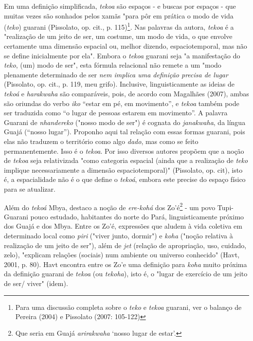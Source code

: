Em uma definição simplificada, \emph{tekoa} são espaços - e buscas por
espaços - que muitas vezes são sonhados pelos xamãs "para pôr em prática
o modo de vida (\emph{teko}) guarani (Pissolato, op. cit., p.
115)\footnote{Para uma discussão completa sobre o \emph{teko} e
  \emph{tekoa} guarani, ver o balanço de Pereira (2004) e Pissolato
  (2007: 105-122)}. Nas palavras da autora, \emph{tekoa} é a "realização
de um jeito de ser, um costume, um modo de vida, o que envolve
certamente uma dimensão espacial ou, melhor dizendo, espaciotemporal,
mas não se define inicialmente por ela". Embora o \emph{tekoa} guarani
seja "a manifestação do \emph{teko}, (um) modo de ser", esta fórmula
relacional não remete a um "modo plenamente determinado de ser \emph{nem
implica uma definição precisa de lugar} (Pissolato, op. cit., p. 119,
meu grifo). Inclusive, linguisticamente as ideias de \emph{tekoá} e
\emph{harakwaha} são comparáveis, pois, de acordo com Magalhães (2007),
ambas são oriundas do verbo \emph{iko} ``estar em pé, em movimento'', e
\emph{tekoa} também pode ser traduzida como ``o lugar de pessoas estarem
em movimento''. A palavra Guarani de \emph{nhandereko} ("nosso modo de
ser") é cognata do \emph{janakwaha}, da língua Guajá (``nosso lugar'').
Proponho aqui tal relação com essas formas guarani, pois elas não
traduzem o território como algo \emph{dado}, mas como se feito
permanentemente. Isso é o \emph{tekoa}. Por isso diversos autores
propõem que a noção de \emph{tekoa} seja relativizada "como categoria
espacial (ainda que a realização de \emph{teko} implique necessariamente
a dimensão espaciotemporal)" (Pissolato, op. cit), isto é, a
espacialidade não é o que define o \emph{tekoá}, embora este precise do
espaço físico para se atualizar.

Além do \emph{tekoá} Mbya, destaco a noção de \emph{ere-kohá} dos
Zo'é\footnote{Que seria em Guajá \emph{arirakwaha} `nosso lugar de
  estar'.} - um povo Tupi-Guarani pouco estudado, habitantes do norte do
Pará, linguisticamente próximo dos Guajá e dos Mbya. Entre os Zo'é,
expressões que aludem à vida coletiva em determinado local como
\emph{piri} ("viver junto, dormir") e \emph{koha} ("noção relativa à
realização de um jeito de ser"), além de \emph{jet} (relação de
apropriação, uso, cuidado, zelo), "explicam relações (sociais) num
ambiente ou universo conhecido" (Havt, 2001, p. 80). Havt encontra entre
os Zo'e uma definição para \emph{koha} muito próxima da definição
guarani de \emph{tekoa} (ou \emph{tekoha}), isto é, o "lugar de
exercício de um jeito de ser/ viver" (idem).

